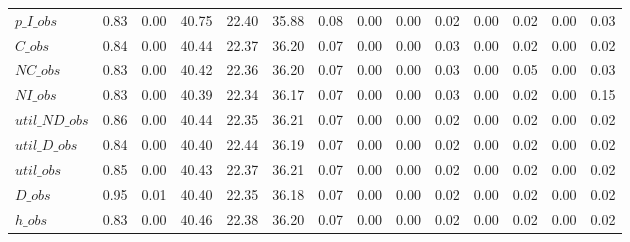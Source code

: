 \begin{center}
\begin{longtable}{lccccccccccccc}
$p\_I\_obs      $	 & 	            0.83	 & 	            0.00	 & 	           40.75	 & 	           22.40	 & 	           35.88	 & 	            0.08	 & 	            0.00	 & 	            0.00	 & 	            0.02	 & 	            0.00	 & 	            0.02	 & 	            0.00	 & 	            0.03 \\ 
$C\_obs         $	 & 	            0.84	 & 	            0.00	 & 	           40.44	 & 	           22.37	 & 	           36.20	 & 	            0.07	 & 	            0.00	 & 	            0.00	 & 	            0.03	 & 	            0.00	 & 	            0.02	 & 	            0.00	 & 	            0.02 \\ 
$NC\_obs        $	 & 	            0.83	 & 	            0.00	 & 	           40.42	 & 	           22.36	 & 	           36.20	 & 	            0.07	 & 	            0.00	 & 	            0.00	 & 	            0.03	 & 	            0.00	 & 	            0.05	 & 	            0.00	 & 	            0.03 \\ 
$NI\_obs        $	 & 	            0.83	 & 	            0.00	 & 	           40.39	 & 	           22.34	 & 	           36.17	 & 	            0.07	 & 	            0.00	 & 	            0.00	 & 	            0.03	 & 	            0.00	 & 	            0.02	 & 	            0.00	 & 	            0.15 \\ 
$util\_ND\_obs  $	 & 	            0.86	 & 	            0.00	 & 	           40.44	 & 	           22.35	 & 	           36.21	 & 	            0.07	 & 	            0.00	 & 	            0.00	 & 	            0.02	 & 	            0.00	 & 	            0.02	 & 	            0.00	 & 	            0.02 \\ 
$util\_D\_obs   $	 & 	            0.84	 & 	            0.00	 & 	           40.40	 & 	           22.44	 & 	           36.19	 & 	            0.07	 & 	            0.00	 & 	            0.00	 & 	            0.02	 & 	            0.00	 & 	            0.02	 & 	            0.00	 & 	            0.02 \\ 
$util\_obs      $	 & 	            0.85	 & 	            0.00	 & 	           40.43	 & 	           22.37	 & 	           36.21	 & 	            0.07	 & 	            0.00	 & 	            0.00	 & 	            0.02	 & 	            0.00	 & 	            0.02	 & 	            0.00	 & 	            0.02 \\ 
$D\_obs         $	 & 	            0.95	 & 	            0.01	 & 	           40.40	 & 	           22.35	 & 	           36.18	 & 	            0.07	 & 	            0.00	 & 	            0.00	 & 	            0.02	 & 	            0.00	 & 	            0.02	 & 	            0.00	 & 	            0.02 \\ 
$h\_obs         $	 & 	            0.83	 & 	            0.00	 & 	           40.46	 & 	           22.38	 & 	           36.20	 & 	            0.07	 & 	            0.00	 & 	            0.00	 & 	            0.02	 & 	            0.00	 & 	            0.02	 & 	            0.00	 & 	            0.02 \\ 
\end{longtable}
 \end{center}
